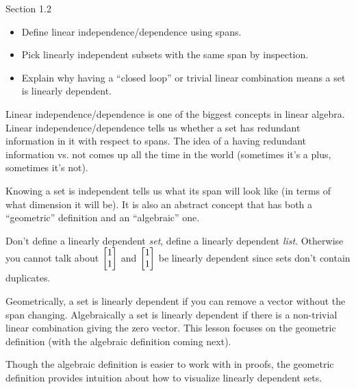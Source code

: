 \documentclass{problemset}
\begin{document}
\begin{lesson}

	Section 1.2

	\begin{itemize}
		\item Define linear independence/dependence using spans.
		\item Pick linearly independent subsets with the same span by inspection.
		\item Explain why having a ``closed loop'' or trivial linear combination
			means a set is linearly dependent.
	\end{itemize}

	Linear independence/dependence is one of the biggest concepts in linear algebra.
	Linear independence/dependence tells us whether a set has redundant information
	in it with respect to spans. The idea of a having redundant information vs\mbox{.}
	not comes up all the time in the world (sometimes it's a plus, sometimes it's not).

	Knowing
	a set is independent tells us what its span will look like (in terms of what dimension
	it will be). It is also an abstract concept that has both a ``geometric'' definition
	and an ``algebraic'' one.
	\begin{annotation}
		\begin{notes}
			Don't define a linearly dependent \emph{set}, define
			a linearly dependent \emph{list}. Otherwise you cannot talk about
			$\mat{1\\1}$ and $\mat{1\\1}$ be linearly dependent since sets don't
			contain duplicates.
		\end{notes}
	\end{annotation}
	Geometrically, a set is linearly dependent if you can remove
	a vector without the span changing. Algebraically a set is linearly dependent if there
	is a non-trivial linear combination giving the zero vector. This lesson focuses on the
	geometric definition (with the algebraic definition coming next).

	Though the algebraic definition is easier to work with in proofs, the geometric definition
	provides intuition about how to visualize linearly
	dependent sets.

\end{lesson}
\end{document}

